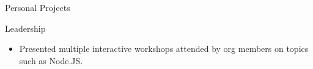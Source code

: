\documentclass{resume} %
\begin{document}
\begin{workSection}{Personal Projects}
\end{workSection}

\begin{workSection}{Leadership}
    \customItem[
        title=Association for Computing Machinery,
        keyHighlight=Multiple leadership roles{,} including publicity officer \& treasurer,
        duration=Fall 2022 - Present
    ]
    \begin{itemize}
        \vspace{-0.5em}
        \itemsep -6pt {}
        \item Presented multiple interactive workshops attended by org members on topics such as Node.JS.
    \end{itemize}
\end{workSection}

\end{document}
